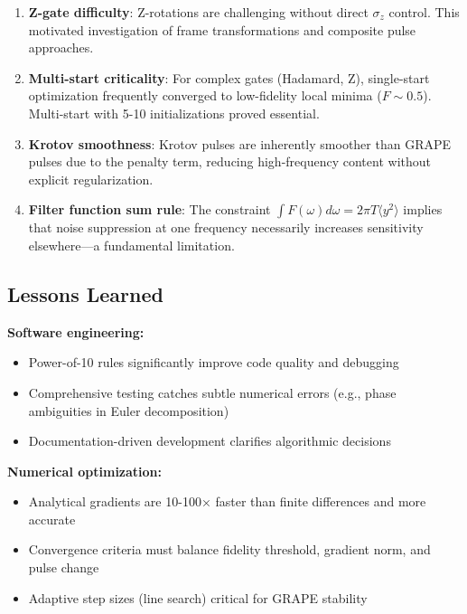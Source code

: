 \documentclass[11pt,a4paper]{article}
\theoremstyle{definition}
\theoremstyle{remark}
\begin{document}
\begin{enumerate}
    \item \textbf{Z-gate difficulty}: Z-rotations are challenging without direct $\sigma_z$ control. This motivated investigation of frame transformations and composite pulse approaches.

    \item \textbf{Multi-start criticality}: For complex gates (Hadamard, Z), single-start optimization frequently converged to low-fidelity local minima ($F \sim 0.5$). Multi-start with 5-10 initializations proved essential.

    \item \textbf{Krotov smoothness}: Krotov pulses are inherently smoother than GRAPE pulses due to the penalty term, reducing high-frequency content without explicit regularization.

    \item \textbf{Filter function sum rule}: The constraint $\int F(\omega)d\omega = 2\pi T\langle y^2\rangle$ implies that noise suppression at one frequency necessarily increases sensitivity elsewhere—a fundamental limitation.
\end{enumerate}

\subsection{Lessons Learned}

\textbf{Software engineering:}
\begin{itemize}
    \item Power-of-10 rules significantly improve code quality and debugging
    \item Comprehensive testing catches subtle numerical errors (e.g., phase ambiguities in Euler decomposition)
    \item Documentation-driven development clarifies algorithmic decisions
\end{itemize}

\textbf{Numerical optimization:}
\begin{itemize}
    \item Analytical gradients are 10-100× faster than finite differences and more accurate
    \item Convergence criteria must balance fidelity threshold, gradient norm, and pulse change
    \item Adaptive step sizes (line search) critical for GRAPE stability
\end{itemize}
\end{document}
